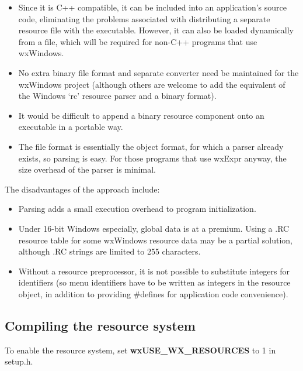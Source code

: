 \begin{itemize}\itemsep=0pt
\item Since it is C++ compatible, it can be included into an application's source code,
eliminating the problems associated with distributing a separate resource file
with the executable. However, it can also be loaded dynamically from a file, which will be required
for non-C++ programs that use wxWindows.
\item No extra binary file format and separate converter need be maintained for the wxWindows project
(although others are welcome to add the equivalent of the Windows `rc' resource
parser and a binary format).
\item It would be difficult to append a binary resource component onto an executable
in a portable way.
\item The file format is essentially the  object format, for which
a parser already exists, so parsing is easy. For those programs that use wxExpr
anyway, the size overhead of the parser is minimal.
\end{itemize}

The disadvantages of the approach include:

\begin{itemize}\itemsep=0pt
\item Parsing adds a small execution overhead to program initialization.
\item Under 16-bit Windows especially, global data is at a premium.
Using a .RC resource table for some wxWindows resource data may be a partial solution,
although .RC strings are limited to 255 characters.
\item Without a resource preprocessor, it is not possible to substitute integers
for identifiers (so menu identifiers have to be written as integers in the resource
object, in addition to providing \#defines for application code convenience).
\end{itemize}

\subsection{Compiling the resource system}

To enable the resource system, set {\bf wxUSE\_WX\_RESOURCES} to 1 in setup.h.

